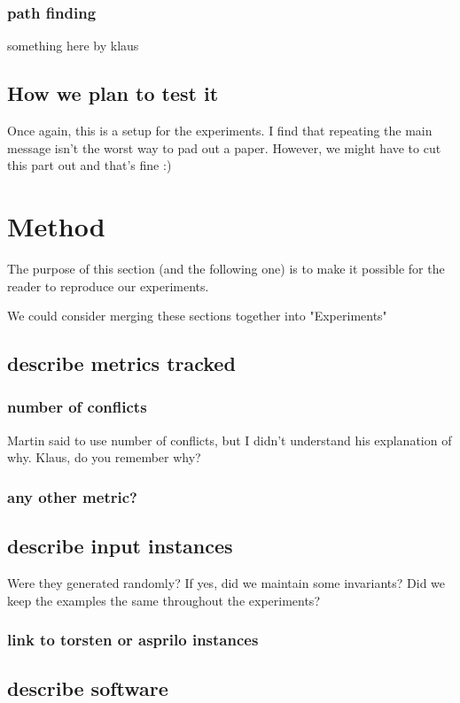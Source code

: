 \documentclass[11pt]{article}
\begin{document}
\subsubsection{path finding}
\label{sec:org69ea791}
something here by klaus
\subsection{How we plan to test it}
\label{sec:org7a56bac}
Once again, this is a setup for the experiments. I find that repeating the main message isn't the worst way to pad out a paper. However, we might have to cut this part out and that's fine :)
\section{Method}
\label{sec:org8516e65}
The purpose of this section (and the following one) is to make it possible for the reader to reproduce our experiments.

We could consider merging these sections together into "Experiments"
\subsection{describe metrics tracked}
\label{sec:orgabdf258}
\subsubsection{number of conflicts}
\label{sec:org90fa98e}
Martin said to use number of conflicts, but I didn't understand his explanation of why. Klaus, do you remember why?
\subsubsection{any other metric?}
\label{sec:org0f11b40}
\subsection{describe input instances}
\label{sec:org4f81e71}
Were they generated randomly? If yes, did we maintain some invariants?
Did we keep the examples the same throughout the experiments?
\subsubsection{link to torsten or asprilo instances}
\label{sec:orga248748}
\subsection{describe software}
\label{sec:org54b790c}
\end{document}
